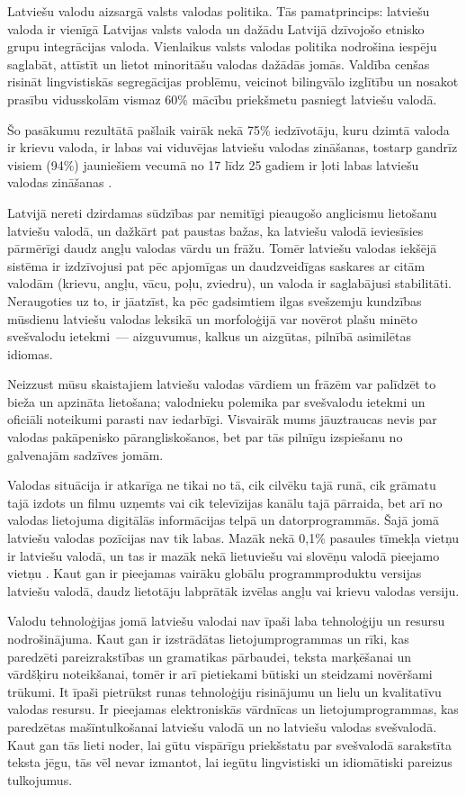 \begin{multicols}{2}
Latviešu valodu aizsargā valsts valodas politika.
Tās pamatprincips: latviešu valoda ir vienīgā Latvijas valsts valoda un dažādu Latvijā dzīvojošo etnisko grupu integrācijas valoda.
Vienlaikus valsts valodas politika nodrošina iespēju saglabāt, attīstīt un lietot minoritāšu valodas dažādās jomās.
Valdība cenšas risināt lingvistiskās segregācijas problēmu, veicinot bilingvālo izglītību un nosakot prasību vidusskolām vismaz 60\% mācību priekšmetu pasniegt latviešu valodā. 

Šo pasākumu rezultātā pašlaik vairāk nekā 75\% iedzīvotāju, kuru dzimtā valoda ir krievu valoda, ir labas vai viduvējas latviešu valodas zināšanas, tostarp gandrīz visiem (94\%) jauniešiem vecumā no 17 līdz 25 gadiem ir ļoti labas latviešu valodas zināšanas \cite{Meta3ES}. 

Latvijā nereti dzirdamas sūdzības par nemitīgi pieaugošo anglicismu lietošanu latviešu valodā, un dažkārt pat paustas bažas, ka latviešu valodā ieviesīsies pārmērīgi daudz angļu valodas vārdu un frāžu.
Tomēr latviešu valodas iekšējā sistēma ir izdzīvojusi pat pēc apjomīgas un daudzveidīgas saskares ar citām valodām (krievu, angļu, vācu, poļu, zviedru), un valoda ir saglabājusi stabilitāti.
Neraugoties uz to, ir jāatzīst, ka pēc gadsimtiem ilgas svešzemju kundzības mūsdienu latviešu valodas leksikā un morfoloģijā var novērot plašu minēto svešvalodu ietekmi~--- aizguvumus, kalkus un aizgūtas, pilnībā asimilētas idiomas. 

Neizzust mūsu skaistajiem latviešu valodas vārdiem un frāzēm var palīdzēt to bieža un apzināta lietošana; valodnieku polemika par svešvalodu ietekmi un oficiāli noteikumi parasti nav iedarbīgi.
Visvairāk mums jāuztraucas nevis par valodas pakāpenisko pārangliskošanos, bet par tās pilnīgu izspiešanu no galvenajām sadzīves jomām.

Valodas situācija ir atkarīga ne tikai no tā, cik cilvēku tajā runā, cik grāmatu tajā izdots un filmu uzņemts vai cik televīzijas kanālu tajā pārraida, bet arī no valodas lietojuma digitālās informācijas telpā un datorprogrammās.
Šajā jomā latviešu valodas pozīcijas nav tik labas.
Mazāk nekā 0,1\% pasaules tīmekļa vietņu ir latviešu valodā, un tas ir mazāk nekā lietuviešu vai slovēņu valodā pieejamo vietņu \cite{Meta4ES}.
Kaut gan ir pieejamas vairāku globālu programmproduktu versijas latviešu valodā, daudz lietotāju labprātāk izvēlas angļu vai krievu valodas versiju. 

Valodu tehnoloģijas jomā latviešu valodai nav īpaši laba tehnoloģiju un resursu nodrošinājuma.
Kaut gan ir izstrādātas lietojumprogrammas un rīki, kas paredzēti pareizrakstības un gramatikas pārbaudei, teksta marķēšanai un vārdšķiru noteikšanai, tomēr ir arī pietiekami būtiski un steidzami novēršami trūkumi.
It īpaši pietrūkst runas tehnoloģiju risinājumu un lielu un kvalitatīvu valodas resursu.
Ir pieejamas elektroniskās vārdnīcas un lietojumprogrammas, kas paredzētas mašīntulkošanai latviešu valodā un no latviešu valodas svešvalodā.
Kaut gan tās lieti noder, lai gūtu vispārīgu priekšstatu par svešvalodā sarakstīta teksta jēgu, tās vēl nevar izmantot, lai iegūtu lingvistiski un idiomātiski pareizus tulkojumus.


\end{multicols}
